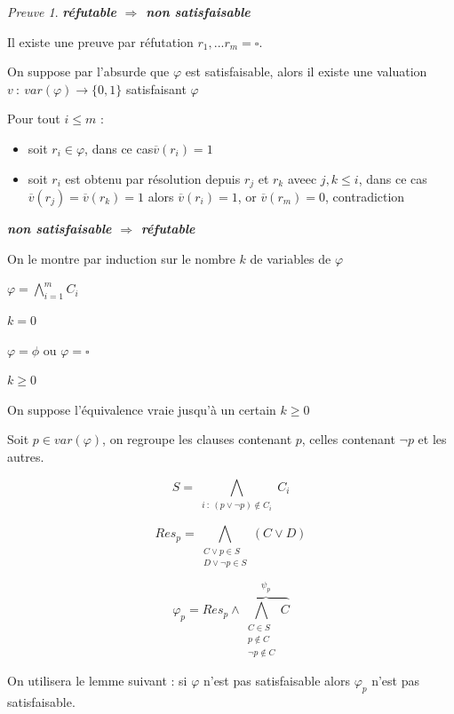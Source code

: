 \documentclass[]{article}
\theoremstyle{remark}
\newtheorem{myproof}{Preuve}
\theoremstyle{definition}
\newcommand{\funcshort}[3]{
#1 ~ : ~ #2 \longrightarrow #3
}
\newenvironment{proofpart}[1]{
	\leavevmode
	
	\noindent
	{\textit{\textbf{\boldmath #1}}}
	
}{
	\checkmark
}
\begin{document}
\begin{myproof}
	\begin{proofpart}{réfutable $\Longrightarrow$ non satisfaisable}
		Il existe une preuve par réfutation $r_1, ...r_m = \square$.
		
		On suppose par l'absurde que $\varphi$ est satisfaisable, alors il existe une valuation $\funcshort{v}{var(\varphi)}{\{0, 1\}}$ satisfaisant $\varphi$
		
		Pour tout $i \leqslant m$ :
		\begin{itemize}
			\item soit $r_i \in \varphi$, dans ce cas$\overline{v}(r_i) = 1$
			\item soit $r_i$ est obtenu par résolution depuis $r_j$ et $r_k$ aveec $j, k \leqslant i$, dans ce cas $\overline{v}(r_j) = \overline{v}(r_k) = 1$ alors $\overline{v}(r_i) = 1$, or $\overline{v}(r_m) = 0$, contradiction
		\end{itemize}
	\end{proofpart}
	
	\begin{proofpart}{non satisfaisable $\Longrightarrow$ réfutable}
		On le montre par induction sur le nombre $k$ de variables de $\varphi$
		
		$\displaystyle \varphi = \bigwedge_{i = 1}^m C_i$
		
		\begin{proofpart}{$k = 0$}
			$\varphi = \phi$ ou $\varphi = \square$
		\end{proofpart}
		
		\begin{proofpart}{$k \geqslant 0$}
			On suppose l'équivalence vraie jusqu'à un certain $k \geqslant 0$
			
			Soit $p \in var(\varphi)$, on regroupe les clauses contenant $p$, celles contenant $\neg p$ et les autres.
			
			$$S = \bigwedge_{\substack{i ~ : ~ (p \lor \neg p) \notin C_i}} C_i$$
			
			$$Res_p = \bigwedge_{\substack{C \lor p \in S \\ D \lor \neg p \in S}} (C \lor D)$$

			$$\varphi_p = Res_p \land \overbrace{\bigwedge_{\substack{C \in S \\ p \notin C \\ \neg p \notin C}} C}^{\psi_p}$$
			
			On utilisera le lemme suivant : si $\varphi$ n'est pas satisfaisable alors $\varphi_p$ n'est pas satisfaisable.
			

\end{proofpart}
\end{proofpart}
\end{myproof}
\end{document}
